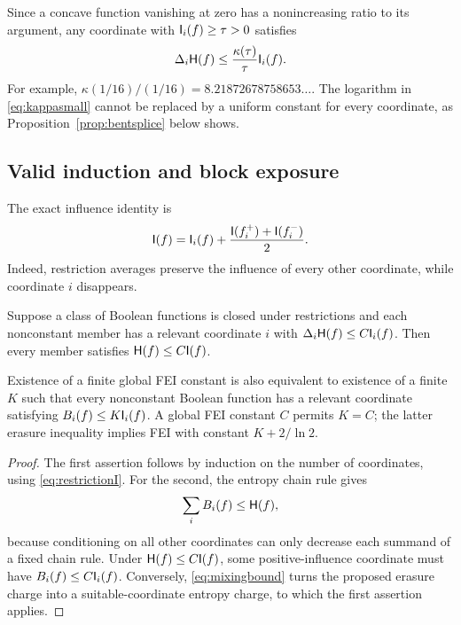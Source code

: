 Since a concave function vanishing at zero has a nonincreasing
ratio to its argument, any coordinate with $\mathsf I_i(f)\ge\tau>0$
satisfies
\begin{equation}\label{eq:kappacutoff}
 \Delta_i\mathsf H(f)\le\frac{\kappa(\tau)}{\tau}\mathsf I_i(f).
\end{equation}
For example, $\kappa(1/16)/(1/16)=8.21872678758653\ldots$.
The logarithm in \eqref{eq:kappasmall} cannot be replaced by a
uniform constant for every coordinate, as
Proposition~\ref{prop:bentsplice} below shows.

\subsection{Valid induction and block exposure}

The exact influence identity is
\begin{equation}\label{eq:restrictionI}
 \mathsf I(f)=\mathsf I_i(f)+\frac{\mathsf I(f_i^+)+\mathsf I(f_i^-)}2.
\end{equation}
Indeed, restriction averages preserve the influence of every
other coordinate, while coordinate $i$ disappears.

\begin{proposition}\label{prop:restrictioninduction}
Suppose a class of Boolean functions is closed under restrictions
and each nonconstant member has a relevant coordinate $i$ with
$\Delta_i\mathsf H(f)\le C\mathsf I_i(f)$. Then every member satisfies
$\mathsf H(f)\le C\mathsf I(f)$.

Existence of a finite global FEI constant is also equivalent to
existence of a finite $K$ such that every nonconstant Boolean
function has a relevant coordinate satisfying $B_i(f)\le K\mathsf I_i(f)$.
A global FEI constant $C$ permits $K=C$; the latter erasure
inequality implies FEI with constant $K+2/\ln2$.
\end{proposition}

\begin{proof}
The first assertion follows by induction on the number of
coordinates, using \eqref{eq:restrictionI}.
For the second, the entropy chain rule gives
\begin{equation}\label{eq:hanerasure}
 \sum_i B_i(f)\le\mathsf H(f),
\end{equation}
because conditioning on all other coordinates can only decrease
each summand of a fixed chain rule. Under $\mathsf H(f)\le C\mathsf I(f)$,
some positive-influence coordinate must have $B_i(f)\le C\mathsf I_i(f)$.
Conversely, \eqref{eq:mixingbound} turns the proposed erasure
charge into a suitable-coordinate entropy charge, to which the
first assertion applies.
\end{proof}

